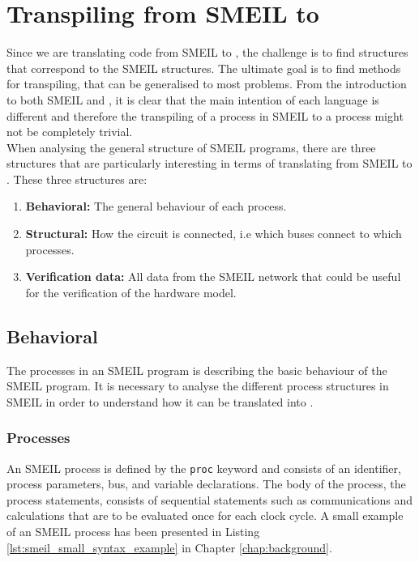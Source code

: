 \section{Transpiling from SMEIL to \cspm{}}
\label{sec:transpiling}
Since we are translating code from SMEIL to \cspm{}, the challenge is to find \cspm{} structures that correspond to the SMEIL structures. The ultimate goal is to find methods for transpiling, that can be generalised to most problems. From the introduction to both SMEIL and \cspm, it is clear that the main intention of each language is different and therefore the transpiling of a process in SMEIL to a \cspm{} process might not be completely trivial.\\

When analysing the general structure of SMEIL programs, there are three structures that are particularly interesting in terms of translating from SMEIL to \cspm{}. These three structures are:
\begin{enumerate}
    \item \textbf{Behavioral:} The general behaviour of each process.
    \item \textbf{Structural:} How the circuit is connected, i.e which buses connect to which processes.
    \item \textbf{Verification data:} All data from the SMEIL network that could be useful for the verification of the hardware model.
\end{enumerate}
\subsection{Behavioral}
The processes in an SMEIL program is describing the basic behaviour of the SMEIL program. It is necessary to analyse the different process structures in SMEIL in order to understand how it can be translated into \cspm{}.
\subsubsection{Processes}
An SMEIL process is defined by the \texttt{proc} keyword and consists of an identifier, process parameters, bus, and variable declarations. The body of the process, the process statements, consists of sequential statements such as communications and calculations that are to be evaluated once for each clock cycle. A small example of an SMEIL process has been presented in Listing \ref{lst:smeil_small_syntax_example} in Chapter \ref{chap:background}. \\

